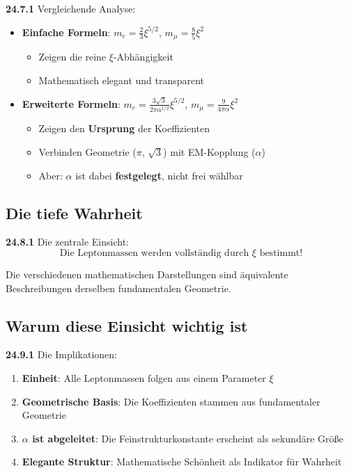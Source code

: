 \noindent \textbf{24.7.1} Vergleichende Analyse:
\begin{itemize}
	\item \textbf{Einfache Formeln}: $m_e = \frac{2}{3}\xi^{5/2}$, $m_\mu = \frac{8}{5}\xi^2$
	\begin{itemize}
		\item Zeigen die reine $\xi$-Abhängigkeit
		\item Mathematisch elegant und transparent
	\end{itemize}
	
	\item \textbf{Erweiterte Formeln}: $m_e = \frac{3\sqrt{3}}{2\pi\alpha^{1/2}}\xi^{5/2}$, $m_\mu = \frac{9}{4\pi\alpha}\xi^2$
	\begin{itemize}
		\item Zeigen den \textbf{Ursprung} der Koeffizienten
		\item Verbinden Geometrie ($\pi$, $\sqrt{3}$) mit EM-Kopplung ($\alpha$)
		\item Aber: $\alpha$ ist dabei \textbf{festgelegt}, nicht frei wählbar
	\end{itemize}
\end{itemize}

\subsection{Die tiefe Wahrheit}

\noindent \textbf{24.8.1} Die zentrale Einsicht:
\[
\boxed{
	\text{Die Leptonmassen werden vollständig durch } \xi \text{ bestimmt!}
}
\]

Die verschiedenen mathematischen Darstellungen sind äquivalente Beschreibungen derselben fundamentalen Geometrie.

\subsection{Warum diese Einsicht wichtig ist}

\noindent \textbf{24.9.1} Die Implikationen:
\begin{enumerate}
	\item \textbf{Einheit}: Alle Leptonmassen folgen aus einem Parameter $\xi$
	\item \textbf{Geometrische Basis}: Die Koeffizienten stammen aus fundamentaler Geometrie
	\item \textbf{$\alpha$ ist abgeleitet}: Die Feinstrukturkonstante erscheint als sekundäre Größe
	\item \textbf{Elegante Struktur}: Mathematische Schönheit als Indikator für Wahrheit
\end{enumerate}

